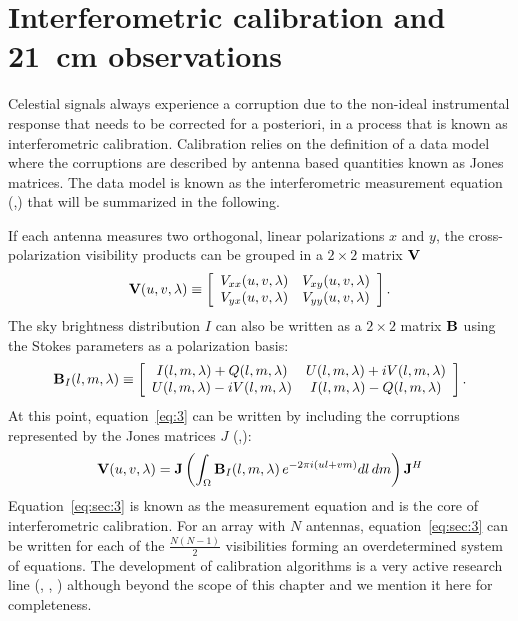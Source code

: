 \section{Interferometric calibration and 21~cm observations}
\label{sec:challenges}

Celestial signals always experience a corruption due to the non-ideal instrumental response that needs to be corrected for a posteriori, in a process that is known as interferometric calibration. Calibration relies on the definition of a data model where the corruptions are described by antenna based quantities known as Jones matrices. The data model is known as the interferometric measurement equation (\cite{hamaker96},\cite{smirnov11}) that will be summarized in the following.

If each antenna measures two orthogonal, linear polarizations $x$ and $y$, the cross-polarization visibility products can be grouped in a $2 \times 2$ matrix ${\bf V}$
\begin{equation}
    {\bf V} (u,v,\lambda) \equiv 
    \left[ 
    \begin{array}{cc}
    V_{xx} (u,v,\lambda) & V_{xy} (u,v,\lambda) \\
    V_{yx} (u,v,\lambda) & V_{yy} (u,v,\lambda) \\
    \end{array}
    \right].   
\label{eq:sec:1}
\end{equation} 
The sky brightness distribution $I$ can also be written as a $2 \times 2$ matrix ${\bf B}$ using the Stokes parameters as a polarization basis:
\begin{equation}
    {\bf B}_I (l,m,\lambda) \equiv 
    \left[
    \begin{array}{cc}
    I (l,m,\lambda) + Q (l,m,\lambda) & U (l,m,\lambda) + iV (l,m,\lambda) \\
    U (l,m,\lambda) - iV (l,m,\lambda) & I (l,m,\lambda) - Q (l,m,\lambda) \\
    \end{array}
    \right].   
\label{eq:sec:2}
\end{equation} 
At this point, equation~\ref{eq:3} can be written by including the corruptions represented by the Jones matrices $J$ (\cite{hamaker96},\cite{smirnov11}):
\begin{equation}
{\bf V} (u,v,\lambda) = {\bf J} \left( \int_\Omega {\bf B}_I (l, m, \lambda) \, e^{-2 \pi i (ul + vm)} dl \, dm  \right) {\bf J}^H
\label{eq:sec:3}
\end{equation} 
Equation~\ref{eq:sec:3} is known as the measurement equation and is the core of interferometric calibration. For an array with $N$ antennas, equation~\ref{eq:sec:3} can be written for each of the $\frac{N (N - 1)}{2}$ visibilities forming an overdetermined system of equations. The development of calibration algorithms is a very active research line (\cite{mitchell08}, \cite{tasse15}, \cite{smirnov15}) although beyond the scope of this chapter and we mention it here for completeness.
